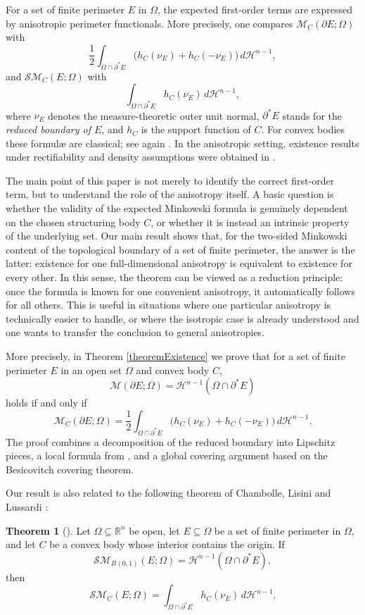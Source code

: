 \documentclass[pdflatex,sn-mathphys-num]{sn-jnl}
\theoremstyle{plain}
\theoremstyle{definition}
\newtheorem*{theorem*}{Theorem}
\begin{document}
\medskip

For a set of finite perimeter $E$ in $\Omega$, the expected first-order terms are expressed by anisotropic perimeter functionals. More precisely, one compares $\mathcal{M}_C(\partial E;\Omega)$ with
\[
\frac{1}{2}\int_{\Omega\cap\partial^*E}\big(h_C(\nu_E)+h_C(-\nu_E)\big)\,d\mathcal{H}^{n-1},
\]
and $\mathcal{SM}_C(E;\Omega)$ with
\[
\int_{\Omega\cap\partial^*E}h_C(\nu_E)\,d\mathcal{H}^{n-1},
\]
where $\nu_E$ denotes the measure-theoretic outer unit normal, $\partial^* E$ stands for the \emph{reduced boundary of $E$}, and $h_C$ is the support function of $C$. For convex bodies these formul{\ae}  are classical; see again \cite[Chapter 5]{rolf}. In the anisotropic setting, existence results under rectifiability and density assumptions were obtained in \cite{Villa2}.

The main point of this paper is not merely to identify the correct first-order term, but to understand the role of the anisotropy itself. A basic question is whether the validity of the expected Minkowski formula is genuinely dependent on the chosen structuring body $C$, or whether it is instead an intrinsic property of the underlying set. Our main result shows that, for the two-sided Minkowski content of the topological boundary of a set of finite perimeter, the answer is the latter: existence for one full-dimensional anisotropy is equivalent to existence for every other. In this sense, the theorem can be viewed as a reduction principle: once the formula is known for one convenient anisotropy, it automatically follows for all others. This is useful in situations where one particular anisotropy is technically easier to handle, or where the isotropic case is already understood and one wants to transfer the conclusion to general anisotropies.

More precisely, in Theorem \ref{theoremExistence} we prove that for a set of finite perimeter $E$ in an open set $\Omega$ and convex body $C$,
\[
\mathcal{M}(\partial E;\Omega)=\mathcal{H}^{n-1}(\Omega\cap\partial^*E)
\]
holds if and only if
\[
\mathcal{M}_C(\partial E;\Omega)
=
\frac{1}{2}
\int_{\Omega\cap\partial^*E}\big(h_C(\nu_E)+h_C(-\nu_E)\big)\,d\mathcal{H}^{n-1}.
\]
The proof combines a decomposition of the reduced boundary into Lipschitz pieces, a local formula from \cite[Lemma 3.3]{Villa2}, and a global covering argument based on the Besicovitch covering theorem.

Our result is also related to the following theorem of Chambolle, Lisini and Lussardi \cite[Theorem 3.4]{chambolle}:
\begin{theorem*}[\cite{chambolle}]
Let $\Omega\subseteq\mathbb{R}^n$ be open, let $E\subseteq\Omega$ be a set of finite perimeter in $\Omega$, and let $C$ be a convex body whose interior contains the origin. If
\[
\mathcal{SM}_{B(0,1)}(E;\Omega)=\mathcal{H}^{n-1}(\Omega\cap\partial^*E),
\]
then
\[
\mathcal{SM}_C(E;\Omega)=\int_{\Omega\cap\partial^*E}h_C(\nu_E)\,d\mathcal{H}^{n-1}.
\]
\end{theorem*}
\end{document}
